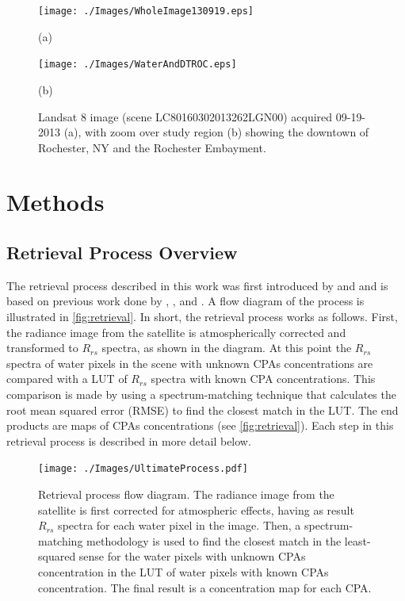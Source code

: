 \documentclass[onecolumn,3p,letterpaper]{elsarticle}
\begin{document}
\begin{figure}[htbp!]
  	\begin{minipage}[c]{0.48\linewidth}
    	\centering
    	\texttt{[image: ./Images/WholeImage130919.eps]}
    	\centerline{(a)}\medskip
  	\end{minipage}
  	\hfill
  	\begin{minipage}[d]{0.48\linewidth}
    	\centering
    	\texttt{[image: ./Images/WaterAndDTROC.eps]}
    	\centerline{(b)}\medskip
    \end{minipage}	

    \caption{Landsat 8 image (scene LC80160302013262LGN00) acquired 09-19-2013 (a), with zoom over study region (b) showing the downtown of Rochester, NY and the Rochester Embayment. \label{fig:L8Image130919} }
\end{figure}

\section{Methods}
\subsection{Retrieval Process Overview}
The retrieval process described in this work was first introduced by \citet{Concha2013IGARSS} and \citet{ConchaThesis2015} and is based on previous work done by \citet{Raqueno:2000}, \citet{Gerace:2012}, \citet{Pahlevan:2012b} and \citet{Gerace:2013}. A flow diagram of the process is illustrated in \autoref{fig:retrieval}. In short, the retrieval process works as follows. First, the radiance image from the satellite is atmospherically corrected and transformed to $R_{rs}$ spectra, as shown in the diagram. At this point the $R_{rs}$ spectra of water pixels in the scene with unknown CPAs concentrations are compared with a LUT of $R_{rs}$ spectra with known CPA concentrations. This comparison is made by using a spectrum-matching technique \citep{Raqueno:2000,Mobley:2005} that calculates the root mean squared error (RMSE) to find the closest match in the LUT. The end products are maps of CPAs concentrations (see \autoref{fig:retrieval}). Each step in this retrieval process is described in more detail below.

\begin{figure}[htb]
  \centering
    \texttt{[image: ./Images/UltimateProcess.pdf]}
    \caption{Retrieval process flow diagram. The radiance image from the satellite is first corrected for atmospheric effects, having as result $R_{rs}$ spectra for each water pixel in the image. Then, a spectrum-matching methodology is used to find the closest match in the least-squared sense for the water pixels with unknown CPAs concentration in the LUT of water pixels with known CPAs concentration. The final result is a concentration map for each CPA.  \label{fig:retrieval} }
\end{figure}
\end{document}
